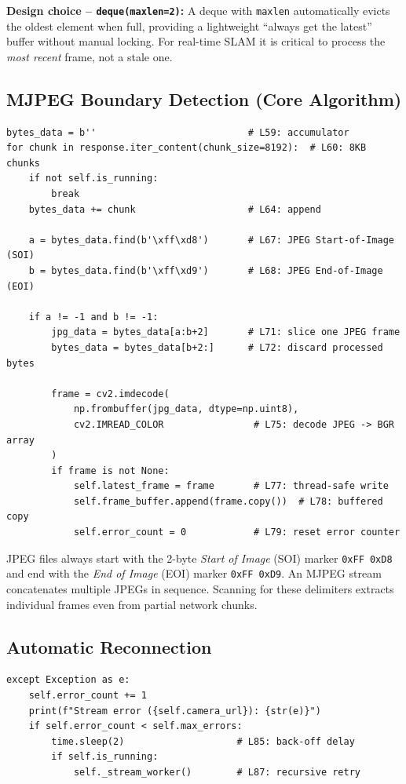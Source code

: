 \documentclass[12pt,a4paper,twoside]{report}
\theoremstyle{definition}
\newcommand{\code}[1]{\texttt{#1}}
\begin{document}
\textbf{Design choice -- \code{deque(maxlen=2)}:} A deque with \code{maxlen}
automatically evicts the oldest element when full, providing a lightweight
``always get the latest'' buffer without manual locking. For real-time SLAM it
is critical to process the \emph{most recent} frame, not a stale one.

\subsection{MJPEG Boundary Detection (Core Algorithm)}

\begin{lstlisting}
bytes_data = b''                           # L59: accumulator
for chunk in response.iter_content(chunk_size=8192):  # L60: 8KB chunks
    if not self.is_running:
        break
    bytes_data += chunk                    # L64: append

    a = bytes_data.find(b'\xff\xd8')       # L67: JPEG Start-of-Image (SOI)
    b = bytes_data.find(b'\xff\xd9')       # L68: JPEG End-of-Image (EOI)

    if a != -1 and b != -1:
        jpg_data = bytes_data[a:b+2]       # L71: slice one JPEG frame
        bytes_data = bytes_data[b+2:]      # L72: discard processed bytes

        frame = cv2.imdecode(
            np.frombuffer(jpg_data, dtype=np.uint8),
            cv2.IMREAD_COLOR                # L75: decode JPEG -> BGR array
        )
        if frame is not None:
            self.latest_frame = frame       # L77: thread-safe write
            self.frame_buffer.append(frame.copy())  # L78: buffered copy
            self.error_count = 0            # L79: reset error counter
\end{lstlisting}

\begin{mathbox}
JPEG files always start with the 2-byte \emph{Start of Image} (SOI) marker
\texttt{0xFF 0xD8} and end with the \emph{End of Image} (EOI) marker
\texttt{0xFF 0xD9}. An MJPEG stream concatenates multiple JPEGs in sequence.
Scanning for these delimiters extracts individual frames even from partial
network chunks.
\end{mathbox}

\subsection{Automatic Reconnection}

\begin{lstlisting}
except Exception as e:
    self.error_count += 1
    print(f"Stream error ({self.camera_url}): {str(e)}")
    if self.error_count < self.max_errors:
        time.sleep(2)                    # L85: back-off delay
        if self.is_running:
            self._stream_worker()        # L87: recursive retry
\end{lstlisting}
\end{document}
